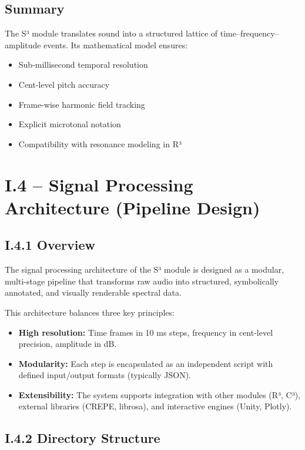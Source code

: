 \subsection*{Summary}

The S³ module translates sound into a structured lattice of time–frequency–amplitude events. Its mathematical model ensures:

\begin{itemize}
    \item Sub-millisecond temporal resolution
    \item Cent-level pitch accuracy
    \item Frame-wise harmonic field tracking
    \item Explicit microtonal notation
    \item Compatibility with resonance modeling in R³
\end{itemize}

\section*{I.4 – Signal Processing Architecture (Pipeline Design)}

\subsection*{I.4.1 Overview}

The signal processing architecture of the S³ module is designed as a modular, multi-stage pipeline that transforms raw audio into structured, symbolically annotated, and visually renderable spectral data.

This architecture balances three key principles:

\begin{itemize}
    \item \textbf{High resolution:} Time frames in 10 ms steps, frequency in cent-level precision, amplitude in dB.
    \item \textbf{Modularity:} Each step is encapsulated as an independent script with defined input/output formats (typically JSON).
    \item \textbf{Extensibility:} The system supports integration with other modules (R³, C³), external libraries (CREPE, librosa), and interactive engines (Unity, Plotly).
\end{itemize}

\subsection*{I.4.2 Directory Structure}

